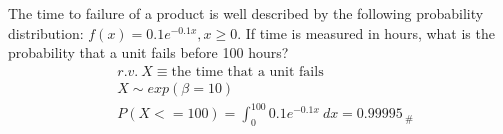The time to failure of a product is well described by the following probability distribution: $f(x) = 0.1e^{-0.1x}, x \geq 0$. If time is measured in hours, what is the probability that a unit fails before 100 hours?
    \begin{align*}
        &r.v. \ X \equiv \text{the time that a unit fails}\\
        &X \sim exp(\beta = 10)\\
        &P(X <= 100) = \int_{0}^{100} 0.1e^{-0.1x} \ dx = 0.99995_{ \ \#}\\
    \end{align*}


